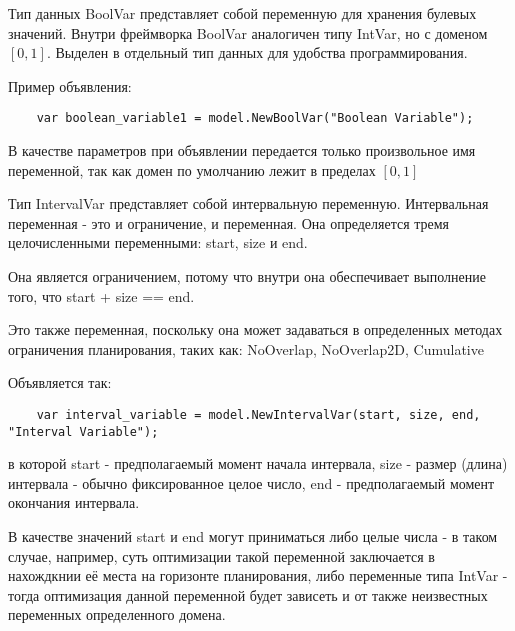 Тип данных BoolVar представляет собой переменную для хранения булевых значений. Внутри фреймворка BoolVar аналогичен типу IntVar, но с доменом $[0, 1]$. Выделен в отдельный тип данных для удобства программирования.

Пример объявления:
\begin{lstlisting}
	var boolean_variable1 = model.NewBoolVar("Boolean Variable");
\end{lstlisting}
В качестве параметров при объявлении передается только произвольное имя переменной, так как домен по умолчанию лежит в пределах $[0, 1]$

Тип IntervalVar представляет собой интервальную переменную. Интервальная переменная - это и ограничение, и переменная. Она определяется тремя целочисленными переменными: start, size и end.

Она является ограничением, потому что внутри она обеспечивает выполнение того, что start + size == end.

Это также переменная, поскольку она может задаваться в определенных методах ограничения планирования, таких как: NoOverlap, NoOverlap2D, Cumulative

Объявляется так:
\begin{lstlisting}
	var interval_variable = model.NewIntervalVar(start, size, end, "Interval Variable");
\end{lstlisting}
в которой start - предполагаемый момент начала интервала, size - размер (длина) интервала - обычно фиксированное целое число, end - предполагаемый момент окончания интервала. 

В качестве значений start и end могут приниматься либо целые числа - в таком случае, например, суть оптимизации такой переменной заключается в нахождкнии её места на горизонте планирования, либо переменные типа IntVar - тогда оптимизация данной переменной будет зависеть и от также неизвестных переменных определенного домена. 
\clearpage
